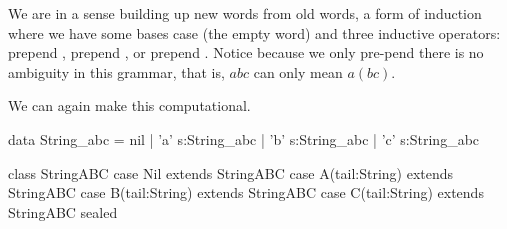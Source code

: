 We are in a sense building up new words from old words, 
a form of induction where we have some bases case (the empty word)
and three inductive operators: prepend , prepend , or 
prepend .
Notice because we only pre-pend there is no ambiguity 
in this grammar, that is, $abc$ can only mean $a(bc)$.

We can again make this computational.
\begin{Fcode}[]
data String_abc = nil
            | 'a' s:String_abc
            | 'b' s:String_abc
            | 'c' s:String_abc
\end{Fcode}
\begin{Pcode}[]
class StringABC
  case Nil extends StringABC
  case A(tail:String) extends StringABC
  case B(tail:String) extends StringABC
  case C(tail:String) extends StringABC
sealed
\end{Pcode}
    
